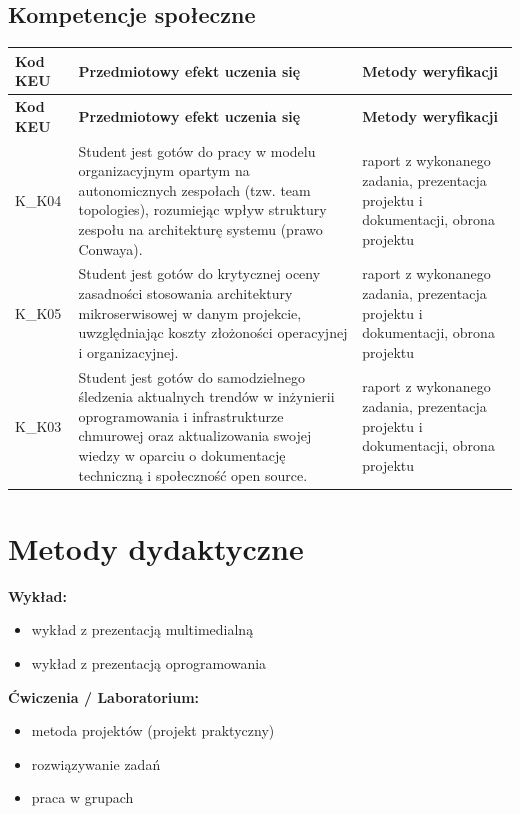 \documentclass[12pt, a4paper]{article}
\newcommand{\thdrule}{\noalign{\global\setlength{\extrarowheight}{0pt}}}
\newcommand{\thdend}{\noalign{\global\setlength{\extrarowheight}{3pt}}}
\begin{document}
\subsection*{Kompetencje społeczne}
{\scriptsize
\begin{longtable}{m{1.6cm}m{9.0cm}m{4.2cm}}
\thdrule\toprule
\rowcolor{pjatkRed} {\color{white}\footnotesize\textbf{\vphantom{Ag}Kod KEU}} & {\color{white}\footnotesize\textbf{\vphantom{Ag}Przedmiotowy efekt uczenia się}} & {\color{white}\footnotesize\textbf{\vphantom{Ag}Metody weryfikacji}} \\
\midrule\thdend
\endfirsthead
\thdrule\toprule
\rowcolor{pjatkRed} {\color{white}\footnotesize\textbf{\vphantom{Ag}Kod KEU}} & {\color{white}\footnotesize\textbf{\vphantom{Ag}Przedmiotowy efekt uczenia się}} & {\color{white}\footnotesize\textbf{\vphantom{Ag}Metody weryfikacji}} \\
\midrule\thdend
\endhead
  \rowcolor{tableRowLight} K\_K04 & Student jest gotów do pracy w modelu organizacyjnym opartym na autonomicznych zespołach (tzw. team topologies), rozumiejąc wpływ struktury zespołu na architekturę systemu (prawo Conwaya). & raport z wykonanego zadania, prezentacja projektu i dokumentacji, obrona projektu \\
  \rowcolor{tableRowAlt} K\_K05 & Student jest gotów do krytycznej oceny zasadności stosowania architektury mikroserwisowej w danym projekcie, uwzględniając koszty złożoności operacyjnej i organizacyjnej. & raport z wykonanego zadania, prezentacja projektu i dokumentacji, obrona projektu \\
  \rowcolor{tableRowLight} K\_K03 & Student jest gotów do samodzielnego śledzenia aktualnych trendów w inżynierii oprogramowania i infrastrukturze chmurowej oraz aktualizowania swojej wiedzy w oparciu o dokumentację techniczną i społeczność open source. & raport z wykonanego zadania, prezentacja projektu i dokumentacji, obrona projektu \\
\bottomrule
\end{longtable}}

\section{Metody dydaktyczne}

\textbf{Wykład:}
\begin{itemize}
  \item wykład z prezentacją multimedialną
  \item wykład z prezentacją oprogramowania
\end{itemize}
\vspace{4pt}
\textbf{Ćwiczenia / Laboratorium:}
\begin{itemize}
  \item metoda projektów (projekt praktyczny)
  \item rozwiązywanie zadań
  \item praca w grupach
\end{itemize}
\vspace{4pt}
\end{document}
